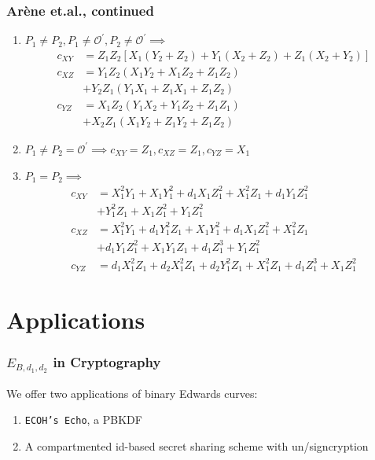 \documentclass[xcolor=dvipsnames, handout]{beamer}
\begin{document}
\begin{frame}
    \frametitle{Ar\`ene et.al., continued}
    \begin{enumerate}
        \item
        $P_1 \ne P_2, P_1 \ne \mathcal{O}^\prime, P_2 \ne \mathcal{O}^\prime
            \implies$
        \begin{align*}
            c_{XY}  &=Z_1Z_2\left[X_1(Y_2 + Z_2) + Y_1(X_2 +Z_2) + Z_1(X_2 +
                Y_2)\right]\\
            c_{XZ}  &=Y_1Z_2(X_1Y_2 + X_1Z_2 + Z_1Z_2)\\
                    &+ Y_2Z_1(Y_1X_1 + Z_1X_1 + Z_1Z_2)\\
            c_{YZ}  &=X_1Z_2(Y_1X_2 + Y_1Z_2 + Z_1Z_1)\\
                    &+ X_2Z_1(X_1Y_2 + Z_1Y_2 + Z_1Z_2)
        \end{align*}
        \item
        $P_1 \ne P_2 = \mathcal{O}^\prime \implies c_{XY} = Z_1, c_{XZ} =
            Z_1, c_{YZ} = X_1$
        \item
        $P_1 = P_2 \implies$
        \begin{align*}
            c_{XY}  &=  X_1^2Y_1 + X_1Y_1^2 + d_1X_1Z_1^2 + X_1^2Z_1 +
                d_1Y_1Z_1^2\\
                    &+ Y_1^2Z_1 + X_1Z_1^2 + Y_1Z_1^2\\
            c_{XZ}  &=  X_1^2Y_1 + d_1Y_1^2Z_1 + X_1Y_1^2 + d_1X_1Z_1^2 +
                X_1^2Z_1\\
                    &+ d_1Y_1Z_1^2 + X_1Y_1Z_1 + d_1Z_1^3 + Y_1Z_1^2\\
            c_{YZ}  &=  d_1X_1^2Z_1 +d_2X_1^2Z_1 + d_2Y_1^2Z_1 + X_1^2Z_1 +
                d_1Z_1^3 + X_1Z_1^2
        \end{align*}
    \end{enumerate}
\end{frame}

\section{Applications}

\begin{frame}
    \frametitle{$E_{B, d_1, d_2}$ in Cryptography}
    We offer two applications of binary Edwards curves:
    \begin{enumerate}
        \item \texttt{ECOH's Echo}, a PBKDF
        \item A compartmented id-based secret sharing scheme with
        un/signcryption
    \end{enumerate}
\end{frame}
\end{document}
